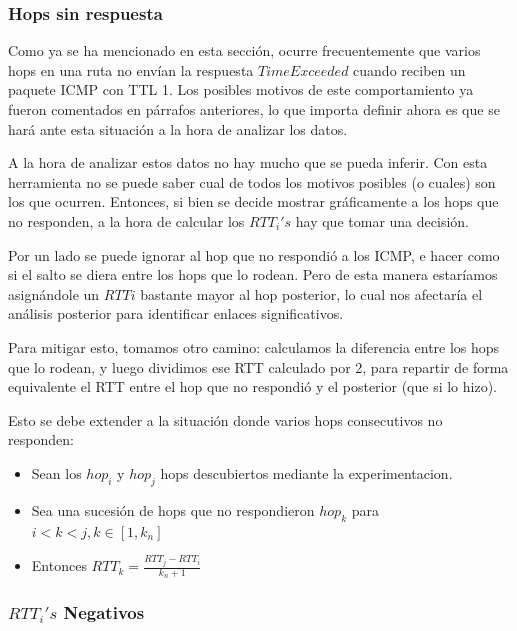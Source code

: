 
\subsubsection*{Hops sin respuesta}
\par Como ya se ha mencionado en esta secci\'on, ocurre frecuentemente que
varios hops en una ruta no env\'ian la respuesta $TimeExceeded$ cuando reciben
un paquete ICMP con TTL 1. Los posibles motivos de este comportamiento ya fueron
comentados en p\'arrafos anteriores, lo que importa definir ahora es que
se har\'a ante esta situaci\'on a la hora de analizar los datos.

\par A la hora de analizar estos datos no hay mucho que se pueda inferir. Con
esta herramienta no se puede saber cual de todos los motivos posibles (o cuales)
son los que ocurren. Entonces, si bien se decide mostrar gr\'aficamente a
los hops que no responden, a la hora de calcular los $RTT_i's$ hay que tomar
una decisi\'on.

\par Por un lado se puede ignorar al hop que no respondi\'o a los ICMP, e
hacer como si el salto se diera entre  los hops que lo rodean. Pero
de esta manera estar\'iamos asign\'andole un $RTTi$ bastante mayor al
hop posterior, lo cual nos afectar\'ia el an\'alisis posterior para identificar
enlaces significativos.

\par Para mitigar esto, tomamos otro camino: calculamos la diferencia entre
los hops que lo rodean, y luego dividimos ese RTT calculado por 2, para repartir
de forma equivalente el RTT entre el hop que no respondi\'o y el posterior
(que si lo hizo).

\par Esto se debe extender a la situaci\'on donde varios hops consecutivos
no responden: 

\begin{itemize}
	\item Sean los $hop_i$ y $hop_j$ hops descubiertos mediante
	la experimentacion.
	\smallskip

	\item Sea una sucesi\'on de hops que no respondieron $hop_k$
	para $i < k <j,k\in[1,k_n]$
	\smallskip

	\item Entonces $RTT_k = \frac{RTT_j-RTT_i}{k_n+1}$

\end{itemize}

\subsubsection*{$RTT_i's$ Negativos}
